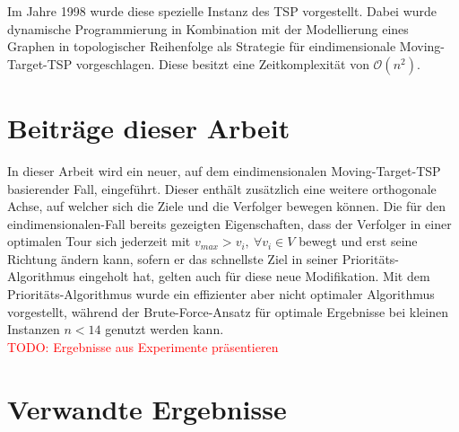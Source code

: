 \documentclass[german,version-2019-11]{uzl-thesis}
\begin{document}
Im Jahre 1998 wurde diese spezielle Instanz des TSP vorgestellt\cite{helvig}. Dabei wurde dynamische Programmierung\cite{kunzi2013einfuhrungskursus} in Kombination mit der Modellierung eines Graphen in topologischer Reihenfolge als Strategie für eindimensionale Moving-Target-TSP vorgeschlagen. Diese besitzt eine Zeitkomplexität von $\mathcal{O}(n^2)$.

\section{Beiträge dieser Arbeit}

In dieser Arbeit wird ein neuer, auf dem eindimensionalen Moving-Target-TSP basierender Fall, eingeführt. Dieser enthält zusätzlich eine weitere orthogonale Achse, auf welcher sich die Ziele und die Verfolger bewegen können. Die für den eindimensionalen-Fall bereits gezeigten Eigenschaften, dass der Verfolger in einer optimalen Tour sich jederzeit mit $v_{max}>v_i,~\forall v_i\in V$ bewegt und erst seine Richtung ändern kann, sofern er das schnellste Ziel in seiner Prioritäts-Algorithmus eingeholt hat, gelten auch für diese neue Modifikation. Mit dem Prioritäts-Algorithmus wurde ein effizienter aber nicht optimaler Algorithmus vorgestellt, während der Brute-Force-Ansatz für optimale Ergebnisse bei kleinen Instanzen $n<14$ genutzt werden kann. \\
\textcolor{red}{TODO: Ergebnisse aus Experimente präsentieren}


\section{Verwandte Ergebnisse}
\end{document}
